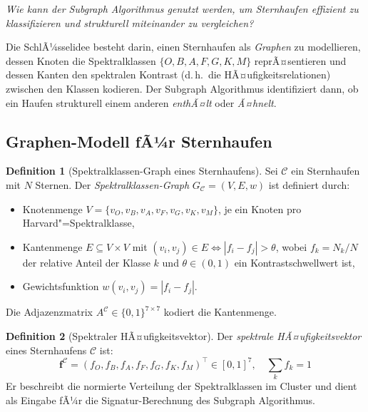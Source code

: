 ﻿\documentclass[a4paper,12pt]{article}
\theoremstyle{definition}
\newtheorem{definition}{Definition}
\begin{document}
\begin{center}
    \emph{Wie kann der Subgraph Algorithmus genutzt werden, um Sternhaufen
    effizient zu klassifizieren und strukturell miteinander zu vergleichen?}
\end{center}

Die SchlÃ¼sselidee besteht darin, einen Sternhaufen als \emph{Graphen} zu
modellieren, dessen Knoten die Spektralklassen $\{O, B, A, F, G, K, M\}$
reprÃ¤sentieren und dessen Kanten den spektralen Kontrast (d.\,h.\ die
HÃ¤ufigkeitsrelationen) zwischen den Klassen kodieren. Der Subgraph Algorithmus
identifiziert dann, ob ein Haufen strukturell einem anderen \emph{enthÃ¤lt}
oder \emph{Ã¤hnelt}.

\subsection{Graphen-Modell fÃ¼r Sternhaufen}

\begin{definition}[Spektralklassen-Graph eines Sternhaufens]
\label{def:clustergraph}
    Sei $\mathcal{C}$ ein Sternhaufen mit $N$ Sternen. Der
    \emph{Spektralklassen-Graph} $G_{\mathcal{C}} = (V, E, w)$ ist definiert durch:
    \begin{itemize}
        \item Knotenmenge $V = \{v_O, v_B, v_A, v_F, v_G, v_K, v_M\}$,
              je ein Knoten pro Harvard"=Spektralklasse,
        \item Kantenmenge $E \subseteq V \times V$ mit
              $(v_i, v_j) \in E \Leftrightarrow |f_i - f_j| > \theta$,
              wobei $f_k = N_k / N$ der relative Anteil der Klasse $k$ und
              $\theta \in (0,1)$ ein Kontrastschwellwert ist,
        \item Gewichtsfunktion $w(v_i, v_j) = |f_i - f_j|$.
    \end{itemize}
    Die Adjazenzmatrix $A^{\mathcal{C}} \in \{0,1\}^{7\times7}$ kodiert die Kantenmenge.
\end{definition}

\begin{definition}[Spektraler HÃ¤ufigkeitsvektor]
\label{def:sigvek}
    Der \emph{spektrale HÃ¤ufigkeitsvektor} eines Sternhaufens $\mathcal{C}$ ist:
    \[
        \mathbf{f}^{\mathcal{C}} = (f_O, f_B, f_A, f_F, f_G, f_K, f_M)^\top
        \in [0,1]^7, \quad \sum_{k} f_k = 1
    \]
    Er beschreibt die normierte Verteilung der Spektralklassen im Cluster und
    dient als Eingabe fÃ¼r die Signatur-Berechnung des Subgraph Algorithmus.
\end{definition}
\end{document}
